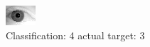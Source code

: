 \begin{figure}[h!]
\begin{center}
\includegraphics[width=0.60\columnwidth]{figures/ID2058_class_4_target_3.png}
\end{center}
\caption{ Classification: 4 actual target: 3}
\label{fig:ID2058_class_4_target_3}
\end{figure}

